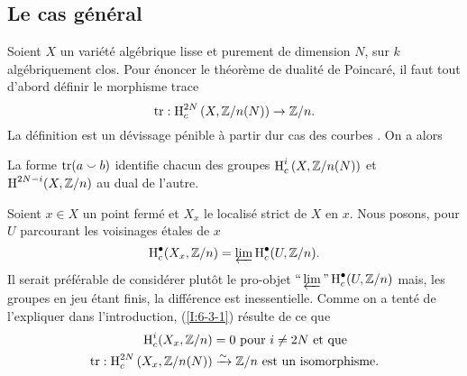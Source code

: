 \documentclass[oneside]{book}
\begin{document}










\subsection{Le cas général}\label{I:6-3}

Soient $X$ un variété algébrique lisse et purement de dimension $N$, sur 
$k$ algébriquement clos. Pour énoncer le théorème de dualité de 
Poincaré, il faut tout d'abord définir le morphisme trace 
\[
  \operatorname{tr} : \operatorname{H}_c^{2N}\left(X,\mathbb{Z}/n(N)\right) \to \mathbb{Z}/n\text{.}
\]
La définition est un dévissage pénible à partir dur cas des courbes 
\cite[XVIII \S 2]{4}. On a alors 





\begin{theorem}\label{I:6-3-1}
La forme $\operatorname{tr}(a\smallsmile b)$ identifie chacun des groupes 
$\operatorname{H}_c^i\left(X,\mathbb{Z}/n(N)\right)$ et $\operatorname{H}^{2 N-i}(X,\mathbb{Z}/n)$ au dual de l'autre.
\end{theorem}

Soient $x\in X$ un point fermé et $X_x$ le localisé strict de $X$ en $x$. 
Nous posons, pour $U$ parcourant les voisinages étales de $x$ 
\begin{equation}\label{I:eq:17}
  \operatorname{H}_c^\bullet(X_x,\mathbb{Z}/n) = \varprojlim \operatorname{H}_c^\bullet(U,\mathbb{Z}/n) \text{.}
\end{equation}
Il serait préférable de considérer plutôt le pro-objet 
$\text{``}\varprojlim\text{''} \operatorname{H}_c^\bullet(U,\mathbb{Z}/n)$ mais, les groupes en jeu 
étant finis, la différence est inessentielle. Comme on a tenté de 
l'expliquer dans l'introduction, (\ref{I:6-3-1}) résulte de ce que 
\begin{equation}\label{I:eq:18}
\begin{aligned}
  \operatorname{H}_c^i(X_x,\mathbb{Z}/n) &= 0 \text{ pour $i\ne 2N$ et que } \\
  \operatorname{tr} : \operatorname{H}_c^{2 N}\left(X_x,  \mathbb{Z}/n(N)\right) &\xrightarrow\sim \mathbb{Z}/n \text{ est un isomorphisme.} 
\end{aligned}
\end{equation}
\end{document}
